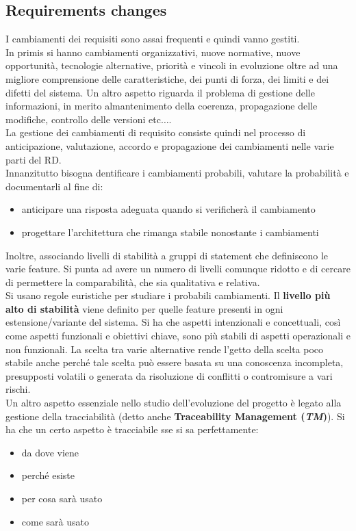 \documentclass[a4paper,12pt, oneside]{book}
\begin{document}
\subsection{Requirements changes}
I cambiamenti dei requisiti sono assai frequenti e quindi vanno gestiti.\\
In primis si hanno cambiamenti organizzativi, nuove normative, nuove
opportunità, tecnologie alternative, priorità e vincoli in evoluzione oltre ad
una migliore comprensione delle caratteristiche, dei punti di forza, dei limiti
e dei difetti del sistema. Un altro aspetto riguarda il problema di gestione
delle informazioni, in merito almantenimento della coerenza, propagazione delle
modifiche, controllo delle versioni etc$\ldots$.\\
La gestione dei cambiamenti di requisito consiste quindi nel processo di
anticipazione, valutazione, accordo e propagazione dei cambiamenti nelle varie
parti del RD.  \\
Innanzitutto bisogna dentificare i cambiamenti probabili, valutare la
probabilità e documentarli al fine di:
\begin{itemize}
  \item anticipare una risposta adeguata quando si verificherà il cambiamento 
  \item progettare l'architettura che rimanga stabile nonostante i cambiamenti
\end{itemize}
Inoltre, associando livelli di stabilità a gruppi di statement che definiscono
le varie feature. Si punta ad avere un numero di livelli comunque ridotto e di
cercare di permettere la comparabilità, che sia qualitativa e relativa.\\
Si usano regole euristiche per studiare i probabili cambiamenti. Il
\textbf{livello più alto di stabilità} viene definito per quelle feature
presenti in ogni estensione/variante del sistema. Si ha che aspetti intenzionali
e concettuali, così come aspetti funzionali e obiettivi chiave, sono più stabili
di aspetti operazionali e non funzionali. La scelta tra varie alternative rende
l'getto della scelta poco stabile anche perché tale scelta può essere basata su
una conoscenza incompleta, presupposti volatili o generata da risoluzione di
conflitti o contromisure a vari rischi.\\
Un altro aspetto essenziale nello studio dell'evoluzione del progetto è legato
alla gestione della tracciabilità (detto anche \textbf{Traceability Management
  (\textit{TM})}). Si ha che un certo aspetto è tracciabile sse si sa
perfettamente: 
\begin{itemize}
  \item da dove viene
  \item perché esiste
  \item per cosa sarà usato
  \item come sarà usato
\end{itemize}
\end{document}
